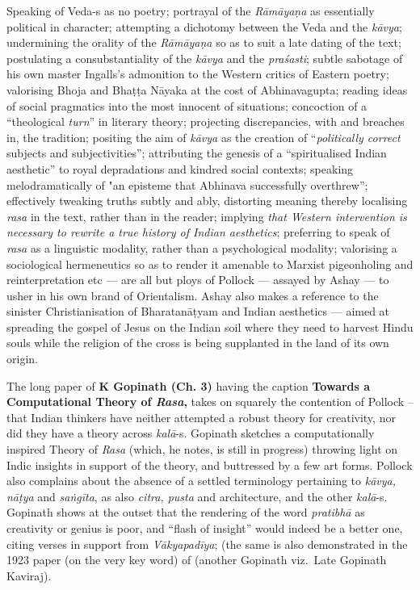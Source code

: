 Speaking of Veda-s as no poetry; portrayal of the \textsl{Rāmāyaṇa} as essentially political in character; attempting a dichotomy between the Veda and the \textsl{kāvya}; undermining the orality of the \textsl{Rāmāyaṇa} so as to suit a late dating of the text; postulating a consubstantiality of the \textsl{kāvya} and the \textsl{praśasti}; subtle sabotage of his own master Ingalls's admonition to the Western critics of Eastern poetry; valorising Bhoja and Bhaṭṭa Nāyaka at the cost of Abhinavagupta; reading ideas of social pragmatics into the most innocent of situations; concoction of a “theological \textsl{turn}” in literary theory; projecting discrepancies, with and breaches in, the tradition; positing the aim of \textsl{kāvya} as the creation of “\textsl{politically correct} subjects and subjectivities''; attributing the genesis of a “spiritualised Indian aesthetic” to royal depradations and kindred social contexts; speaking melodramatically of "an episteme that Abhinava successfully overthrew”; effectively tweaking truths subtly and ably, distorting meaning thereby localising \textsl{rasa} in the text, rather than in the reader; implying \textsl{that Western intervention is necessary to rewrite a true history of Indian aesthetics}; preferring to speak of \textsl{rasa} as a linguistic modality, rather than a psychological modality; valorising a sociological hermeneutics so as to render it amenable to Marxist pigeonholing and reinterpretation etc --- are all but ploys of Pollock --- assayed by Ashay --- to usher in his own brand of Orientalism. Ashay also makes a reference to the sinister Christianisation of Bharatanāṭyam and Indian aesthetics --- aimed at spreading the gospel of Jesus on the Indian soil where they need to harvest Hindu souls while the religion of the cross is being supplanted in the land of its own origin.

The long paper of {\bf K Gopinath (Ch. 3)} having the caption {\bf Towards a Computational Theory of {\sl\bfseries Rasa},} takes on squarely the contention of Pollock -- that Indian thinkers have neither attempted a robust theory for creativity, nor did they have a theory across \textsl{kalā}-s. Gopinath sketches a computationally inspired Theory of \textsl{Rasa} (which, he notes, is still in progress) throwing light on Indic insights in support of the theory, and buttressed by a few art forms. Pollock also complains about the absence of a settled terminology pertaining to \textsl{kāvya, nāṭya} and \textsl{saṅgīta}, as also \textsl{citra, pusta} and architecture, and the other \textsl{kalā}-s. Gopinath shows at the outset that the rendering of the word \textsl{pratibhā} as creativity or genius is poor, and “flash of insight” would indeed be a better one, citing verses in support from \textsl{Vākyapadīya}; (the same is also demonstrated in the 1923 paper (on the very key word) of (another Gopinath viz.\ Late Gopinath Kaviraj).

